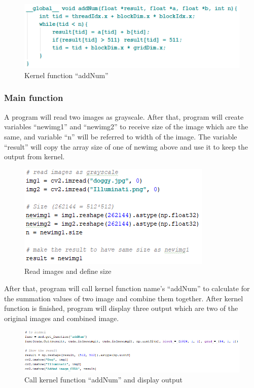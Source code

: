 \documentclass[11pt]{article}
\begin{document}
\begin{figure}[h]
\centering
\includegraphics[scale=0.7]{add1}
\caption{Kernel function “addNum”}
\end{figure}

\subsubsection*{Main function}
A program will read two images as grayscale. After that, program will create variables “newimg1” and “newimg2” to receive size of the image which are the same, and variable “n” will be referred to width of the image. The variable “result” will copy the array size of one of newimg above and use it to keep the output from kernel.

\begin{figure}[h]
\centering
\includegraphics[scale=0.7]{add2}
\caption{Read images and define size}
\end{figure}


After that, program will call kernel function name’s “addNum” to calculate for the summation values of two image and combine them together. After kernel function is finished, program will display three output which are two of the original images and combined image\cite{opencv}.

\begin{figure}[h]
\centering
\includegraphics[scale=0.7]{add3}
\caption{Call kernel function “addNum” and display output}
\end{figure}
\end{document}
